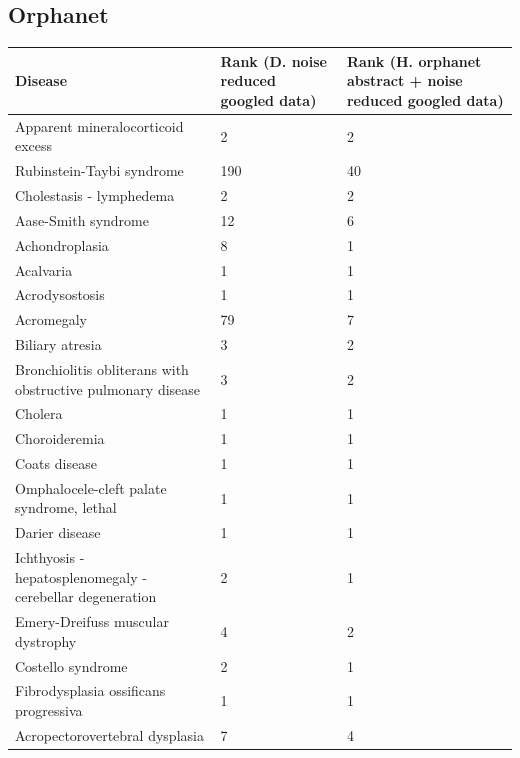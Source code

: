 \documentclass[10pt,letterpaper,two column,final]{article}
\begin{document}
\subsection{Orphanet}
\label{app:orphanet_with_without}
\begin{center}
\begin{small}
	\begin{longtable}{|p{6cm}|p{2.5cm}|p{2.5cm}|}
	\hline
	\textbf{Disease}  & \textbf{Rank (D. noise reduced googled data)} & \textbf{Rank (H. orphanet abstract + noise reduced googled data)} \\
	\hline\hline
Apparent mineralocorticoid excess       &  2 & 2 \\ \hline
Rubinstein-Taybi syndrome               &  190 & 40 \\ \hline
Cholestasis - lymphedema                &  2 & 2 \\ \hline
Aase-Smith syndrome                     &  12 & 6 \\ \hline
Achondroplasia                          &  8 & 1 \\ \hline
Acalvaria                               &  1 & 1 \\ \hline
Acrodysostosis                          &  1 & 1 \\ \hline
Acromegaly                              &  79 & 7 \\ \hline
Biliary atresia                         &   3 & 2 \\ \hline
Bronchiolitis obliterans with obstructive pulmonary disease & 3  & 2 \\ \hline
Cholera                                 &  1 & 1 \\ \hline
Choroideremia                           &  1 & 1 \\ \hline
Coats disease                           &  1 & 1 \\ \hline
Omphalocele-cleft palate syndrome, lethal   &  1 & 1 \\ \hline
Darier disease                          &  1 & 1 \\ \hline
Ichthyosis - hepatosplenomegaly - cerebellar degeneration   & 2 & 1 \\ \hline
Emery-Dreifuss muscular dystrophy       &  4 & 2 \\ \hline
Costello syndrome                       &  2 & 1 \\ \hline
Fibrodysplasia ossificans progressiva   &  1 & 1 \\ \hline
Acropectorovertebral dysplasia          &  7 & 4 \\ \hline

\end{longtable}
\end{small}
\end{center}
\end{document}
